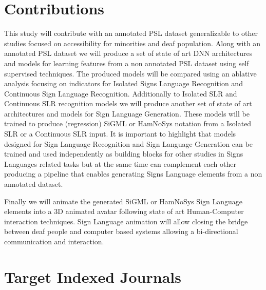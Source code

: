 \section{Contributions}
This study will contribute with an annotated PSL dataset generalizable to other studies focused on accessibility for minorities and deaf population. Along with an annotated PSL dataset we will produce a set of state of art DNN architectures and models for learning features from a non annotated PSL dataset using self supervised techniques. The produced models will be compared using an ablative analysis focusing on indicators for Isolated Signs Language Recognition and Continuous Sign Language Recognition.  Additionally to Isolated SLR and Continuous SLR recognition models we will produce another set of state of art architectures and models for Sign Language Generation. These models will be trained to produce (regression) SiGML or HamNoSys notation from a Isolated SLR or a Continuous  SLR input. It is important to highlight that models designed for Sign Language Recognition and Sign Language Generation can be trained and used independently as building blocks for other studies in Signs Languages related tasks but at the same time can complement each other producing a pipeline that enables generating Signs Language elements from a non annotated dataset.

Finally we will animate the generated SiGML or HamNoSys Sign Language elements into a 3D animated avatar following state of art Human-Computer interaction techniques. Sign Language animation will allow closing the bridge between deaf people and computer based systems allowing a bi-directional communication and interaction.



\section{Target Indexed Journals}
